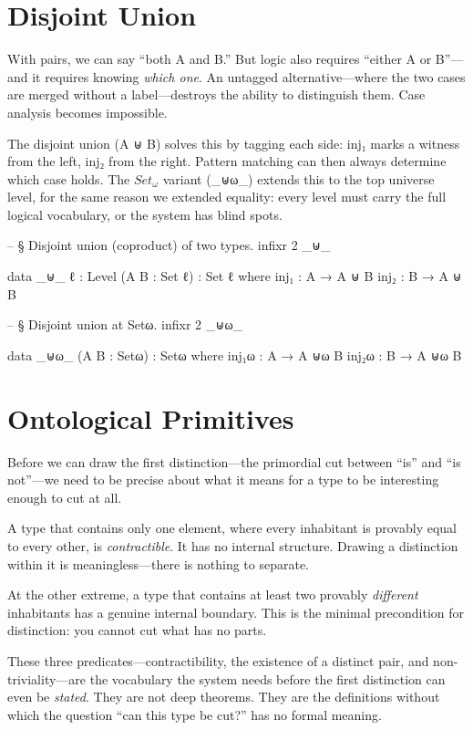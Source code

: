 \documentclass[11pt,a4paper]{book}
\def\texttt#1{#1}%
\begin{document}
\section{Disjoint Union}

With pairs, we can say ``both A and B.'' But logic also requires ``either A or B''—and it requires knowing \textit{which one}. An untagged alternative—where the two cases are merged without a label—destroys the ability to distinguish them. Case analysis becomes impossible.

The disjoint union (\texttt{A ⊎ B}) solves this by tagging each side: \texttt{inj₁} marks a witness from the left, \texttt{inj₂} from the right. Pattern matching can then always determine which case holds. The $\mathit{Set}_\omega$ variant (\texttt{\_⊎ω\_}) extends this to the top universe level, for the same reason we extended equality: every level must carry the full logical vocabulary, or the system has blind spots.

\begin{code}
-- § Disjoint union (coproduct) of two types.
infixr 2 _⊎_

data _⊎_ {ℓ : Level} (A B : Set ℓ) : Set ℓ where
  inj₁ : A → A ⊎ B
  inj₂ : B → A ⊎ B

-- § Disjoint union at Setω.
infixr 2 _⊎ω_

data _⊎ω_ (A B : Setω) : Setω where
  inj₁ω : A → A ⊎ω B
  inj₂ω : B → A ⊎ω B
\end{code}

\section{Ontological Primitives}

Before we can draw the first distinction—the primordial cut between ``is'' and ``is not''—we need to be precise about what it means for a type to be interesting enough to cut at all.

A type that contains only one element, where every inhabitant is provably equal to every other, is \textit{contractible}. It has no internal structure. Drawing a distinction within it is meaningless—there is nothing to separate.

At the other extreme, a type that contains at least two provably \textit{different} inhabitants has a genuine internal boundary. This is the minimal precondition for distinction: you cannot cut what has no parts.

These three predicates—contractibility, the existence of a distinct pair, and non-triviality—are the vocabulary the system needs before the first distinction can even be \textit{stated}. They are not deep theorems. They are the definitions without which the question ``can this type be cut?'' has no formal meaning.
\end{document}
